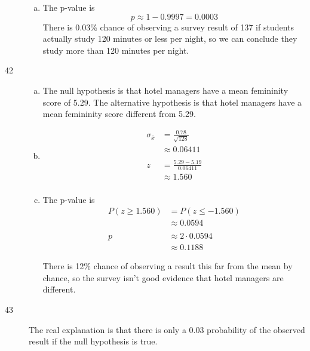 \documentclass[letterpaper]{exam}
\begin{document}
\begin{description}
\begin{enumerate}[(a)]
          \item The p-value is 
            \[
              p \approx 1 - 0.9997 = \boxed{ 0.0003 } 
            \]
            There is 0.03\% chance of observing a survey result of 137 if
            students actually study 120 minutes or less per night, so we can
            conclude they study more than 120 minutes per night.

        \end{enumerate}

      \item[42]
        \begin{enumerate}[(a)]
          \item The null hypothesis is that hotel managers have a mean
            femininity score of 5.29. The alternative hypothesis is that hotel
            managers have a mean femininity score different from 5.29.

          \item
            \begin{align*}
              \sigma_{\bar{x}} & = \frac{0.78}{\sqrt{128}} \\
                               & \approx 0.06411 \\
              \\
              z & = \frac{5.29 - 5.19}{0.06411} \\
                & \approx \boxed{ 1.560 } \\
            \end{align*}

          \item The p-value is 
            \begin{align*}
              P(z \geq 1.560) & = P(z \leq -1.560) \\
                              & \approx 0.0594 \\
              \\
              p & \approx 2 \cdot 0.0594 \\
                & \approx \boxed{ 0.1188 }
            \end{align*}

            There is 12\% chance of observing a result this far from the mean by
            chance, so the survey isn't good evidence that hotel managers are
            different.

        \end{enumerate}

      \item[43] The real explanation is that there is only a 0.03 probability of
        the observed result if the null hypothesis is true. 
        

\end{description}
\end{document}
